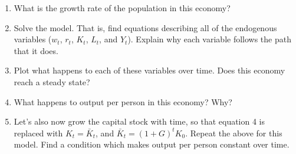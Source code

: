 \documentclass{article}
\begin{document}
\begin{enumerate}
\item What is the growth rate of the population in this economy?
\item Solve the model. That is, find equations describing all of the endogenous variables ($w_t$, $r_t$, $K_t$, $L_t$, and $Y_t$). Explain why each variable follows the path that it does.
\item Plot what happens to each of these variables over time. Does this economy reach a steady state?
\item What happens to output per person in this economy? Why?
\item Let's also now grow the capital stock with time, so that equation 4 is replaced with $K_t = \bar{K}_t$, and $\bar{K}_t = (1+G)^t K_0$. Repeat the above for this model. Find a condition which makes output per person constant over time.
\end{enumerate}
\end{document}
